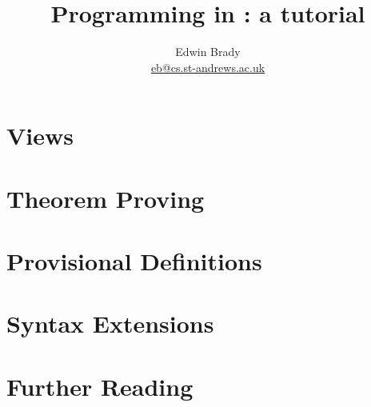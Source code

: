 \documentclass{article}
\title{Programming in \Idris{}: a tutorial}
\author{Edwin Brady \\ \url{eb@cs.st-andrews.ac.uk}}
\begin{document}
\maketitle










\section{Views}
\section{Theorem Proving}
\section{Provisional Definitions}
\section{Syntax Extensions}

%
\section{Further Reading}



\end{document}
